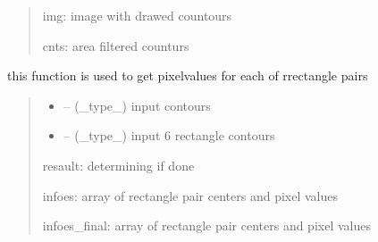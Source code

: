 \documentclass[letterpaper,10pt,english]{sphinxmanual}
\begin{document}
\begin{savenotes}
\begin{fulllineitems}
\begin{savenotes}
\begin{fulllineitems}
\begin{quote}
\begin{description}
\sphinxAtStartPar
img: image with drawed countours

\sphinxAtStartPar
cnts: area filtered counturs

\end{description}\end{quote}

\end{fulllineitems}\end{savenotes}


\begin{savenotes}\begin{fulllineitems}
\label{\detokenize{setting/backend/pxvalue_calibration:oxin.backend.pxvalue_calibration.extract_info.final_decision}}
\pysigstartsignatures
{}
\pysigstopsignatures
\sphinxAtStartPar
this function is used to get pixel\sphinxhyphen{}values for each of rrectangle pairs
\begin{quote}\begin{description}
\begin{itemize}
\item {} 
\sphinxAtStartPar
{} – (\_type\_) input contours

\item {} 
\sphinxAtStartPar
{} – (\_type\_) input 6 rectangle contours

\end{itemize}

\sphinxAtStartPar
resault: determining if done

\sphinxAtStartPar
infoes: array of rectangle pair centers and pixel values

\sphinxAtStartPar
infoes\_final: array of rectangle pair centers and pixel values

\end{description}\end{quote}

\end{fulllineitems}\end{savenotes}


\end{fulllineitems}
\end{savenotes}
\end{document}
